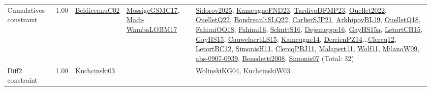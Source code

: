 {\begin{longtable}{p{3cm}r>{\raggedright\arraybackslash}p{6cm}>{\raggedright\arraybackslash}p{6cm}>{\raggedright\arraybackslash}p{8cm}}
\index{Cumulatives constraint}\index{Constraints!Cumulatives constraint}Cumulatives constraint &  1.00 & \hyperref[detail:BeldiceanuC02]{BeldiceanuC02} & \hyperref[detail:MossigeGSMC17]{MossigeGSMC17}, \hyperref[detail:Madi-WambaLOBM17]{Madi-WambaLOBM17} & \hyperref[detail:Sidorov2025]{Sidorov2025}, \hyperref[detail:KameugneFND23]{KameugneFND23}, \hyperref[detail:TardivoDFMP23]{TardivoDFMP23}, \hyperref[detail:Ouellet2022]{Ouellet2022}, \hyperref[detail:OuelletQ22]{OuelletQ22}, \hyperref[detail:BoudreaultSLQ22]{BoudreaultSLQ22}, \hyperref[detail:CarlierSJP21]{CarlierSJP21}, \hyperref[detail:ArkhipovBL19]{ArkhipovBL19}, \hyperref[detail:OuelletQ18]{OuelletQ18}, \hyperref[detail:FahimiOQ18]{FahimiOQ18}, \hyperref[detail:Fahimi16]{Fahimi16}, \hyperref[detail:SchuttS16]{SchuttS16}, \hyperref[detail:Dejemeppe16]{Dejemeppe16}, \hyperref[detail:GayHS15a]{GayHS15a}, \hyperref[detail:LetortCB15]{LetortCB15}, \hyperref[detail:GayHS15]{GayHS15}, \hyperref[detail:CauwelaertLS15]{CauwelaertLS15}, \hyperref[detail:Kameugne14]{Kameugne14}, \hyperref[detail:DerrienPZ14]{DerrienPZ14}...\hyperref[detail:Clercq12]{Clercq12}, \hyperref[detail:LetortBC12]{LetortBC12}, \hyperref[detail:SimonisH11]{SimonisH11}, \hyperref[detail:ClercqPBJ11]{ClercqPBJ11}, \hyperref[detail:Malapert11]{Malapert11}, \hyperref[detail:Wolf11]{Wolf11}, \hyperref[detail:MilanoW09]{MilanoW09}, \hyperref[detail:abs-0907-0939]{abs-0907-0939}, \hyperref[detail:Benedetti2008]{Benedetti2008}, \hyperref[detail:Simonis07]{Simonis07} (Total: 32)\\
\index{Diff2 constraint}\index{Constraints!Diff2 constraint}Diff2 constraint &  1.00 & \hyperref[detail:Kuchcinski03]{Kuchcinski03} &  & \hyperref[detail:WolinskiKG04]{WolinskiKG04}, \hyperref[detail:KuchcinskiW03]{KuchcinskiW03}\\

\end{longtable}}
